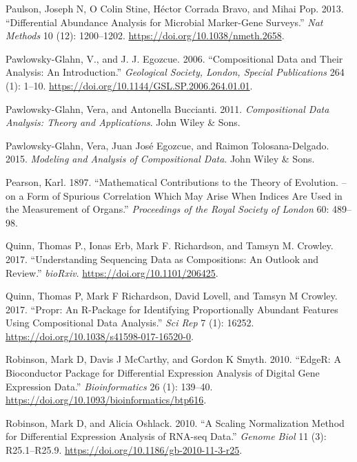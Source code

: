 \documentclass[onecolumn]{article}
\begin{document}
\leavevmode\hypertarget{ref-Paulson:2013aa}{}%
Paulson, Joseph N, O Colin Stine, Héctor Corrada Bravo, and Mihai Pop. 2013. ``Differential Abundance Analysis for Microbial Marker-Gene Surveys.'' \emph{Nat Methods} 10 (12): 1200--1202. \url{https://doi.org/10.1038/nmeth.2658}.

\leavevmode\hypertarget{ref-Pawlowsky-Glahn:2006}{}%
Pawlowsky-Glahn, V., and J. J. Egozcue. 2006. ``Compositional Data and Their Analysis: An Introduction.'' \emph{Geological Society, London, Special Publications} 264 (1): 1--10. \url{https://doi.org/10.1144/GSL.SP.2006.264.01.01}.

\leavevmode\hypertarget{ref-pawlowsky2011compositional}{}%
Pawlowsky-Glahn, Vera, and Antonella Buccianti. 2011. \emph{Compositional Data Analysis: Theory and Applications}. John Wiley \& Sons.

\leavevmode\hypertarget{ref-pawlowsky2015modeling}{}%
Pawlowsky-Glahn, Vera, Juan José Egozcue, and Raimon Tolosana-Delgado. 2015. \emph{Modeling and Analysis of Compositional Data}. John Wiley \& Sons.

\leavevmode\hypertarget{ref-Pearson:1896}{}%
Pearson, Karl. 1897. ``Mathematical Contributions to the Theory of Evolution. -- on a Form of Spurious Correlation Which May Arise When Indices Are Used in the Measurement of Organs.'' \emph{Proceedings of the Royal Society of London} 60: 489--98.

\leavevmode\hypertarget{ref-Quinn206425}{}%
Quinn, Thomas P., Ionas Erb, Mark F. Richardson, and Tamsyn M. Crowley. 2017. ``Understanding Sequencing Data as Compositions: An Outlook and Review.'' \emph{bioRxiv}. \url{https://doi.org/10.1101/206425}.

\leavevmode\hypertarget{ref-Quinn:2017}{}%
Quinn, Thomas P, Mark F Richardson, David Lovell, and Tamsyn M Crowley. 2017. ``Propr: An R-Package for Identifying Proportionally Abundant Features Using Compositional Data Analysis.'' \emph{Sci Rep} 7 (1): 16252. \url{https://doi.org/10.1038/s41598-017-16520-0}.

\leavevmode\hypertarget{ref-Robinson:2010}{}%
Robinson, Mark D, Davis J McCarthy, and Gordon K Smyth. 2010. ``EdgeR: A Bioconductor Package for Differential Expression Analysis of Digital Gene Expression Data.'' \emph{Bioinformatics} 26 (1): 139--40. \url{https://doi.org/10.1093/bioinformatics/btp616}.

\leavevmode\hypertarget{ref-Robinson:2010a}{}%
Robinson, Mark D, and Alicia Oshlack. 2010. ``A Scaling Normalization Method for Differential Expression Analysis of RNA-seq Data.'' \emph{Genome Biol} 11 (3): R25.1--R25.9. \url{https://doi.org/10.1186/gb-2010-11-3-r25}.
\end{document}

